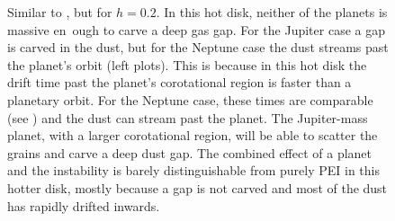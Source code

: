 \documentclass[onecolumn]{report}
\begin{document}
\begin{figure}
  \begin{center}
  \end{center}
  \caption{Similar to , but for $h=0.2$. In this hot disk, neither of the planets is massive en\
    ough
    to carve a deep gas gap. For the Jupiter case a gap is carved in the dust, but for the Neptune case
    the dust streams past the planet's orbit (left plots). This is because in this
    hot disk the drift time past the planet's corotational region
    is faster than a planetary orbit. For the Neptune case, these times
    are comparable (see \sect{sect:eps1h02}) and the dust can stream
    past the planet. The Jupiter-mass planet, with a larger
    corotational region, will be able to scatter the grains and carve
    a deep dust gap. The combined effect of a planet and the instability is barely
    distinguishable from purely PEI in this hotter disk, mostly
    because a gap is not carved and most of the dust has rapidly
    drifted inwards.}
  \label{fig:h02dustgas}
\end{figure}
\end{document}
